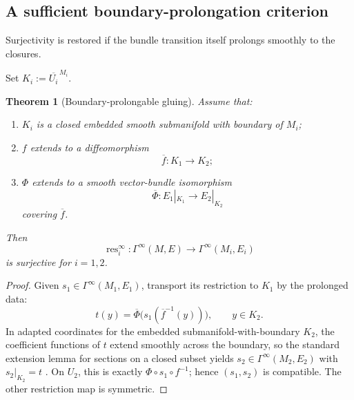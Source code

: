 \documentclass[11pt]{article}
\theoremstyle{plain}
\newtheorem{theorem}{Theorem}[section]
\theoremstyle{definition}
\begin{document}
\subsection{A sufficient boundary-prolongation criterion}
\label{subsec:boundary-prolongable-gluing}

Surjectivity is restored if the bundle transition itself prolongs smoothly to the closures.

Set
\(K_i:=\overline{U_i}^{\,M_i}\).

\begin{theorem}[Boundary-prolongable gluing]
\label{thm:boundary-prolongable-gluing}
Assume that:

\begin{enumerate}[label=\textup{(\roman*)}]
  \item \(K_i\) is a closed embedded smooth submanifold with boundary
        of \(M_i\);

  \item \(f\) extends to a diffeomorphism
        \[
          \overline f:
          K_1\longrightarrow K_2;
        \]

  \item \(\Phi\) extends to a smooth vector-bundle isomorphism
        \[
          \overline\Phi:
          E_1|_{K_1}
          \longrightarrow
          E_2|_{K_2}
        \]
        covering \(\overline f\).
\end{enumerate}

Then
\[
  \operatorname{res}_i^\infty:
  \Gamma^\infty(M,E)
  \longrightarrow
  \Gamma^\infty(M_i,E_i)
\]
is surjective for \(i=1,2\).
\end{theorem}

\begin{proof}
Given \(s_1\in\Gamma^\infty(M_1,E_1)\), transport its restriction to \(K_1\) by the prolonged data:
\[
 t(y)=\overline\Phi\bigl(s_1(\overline f^{-1}(y))\bigr),\qquad y\in K_2.
\]
In adapted coordinates for the embedded submanifold-with-boundary \(K_2\), the coefficient functions of \(t\) extend smoothly across the boundary, so the standard extension lemma for sections on a closed subset yields \(s_2\in\Gamma^\infty(M_2,E_2)\) with \(s_2|_{K_2}=t\) \citep{Lee2012SmoothManifolds}. On \(U_2\), this is exactly \(\Phi\circ s_1\circ f^{-1}\); hence \((s_1,s_2)\) is compatible. The other restriction map is symmetric.
\end{proof}
\end{document}
